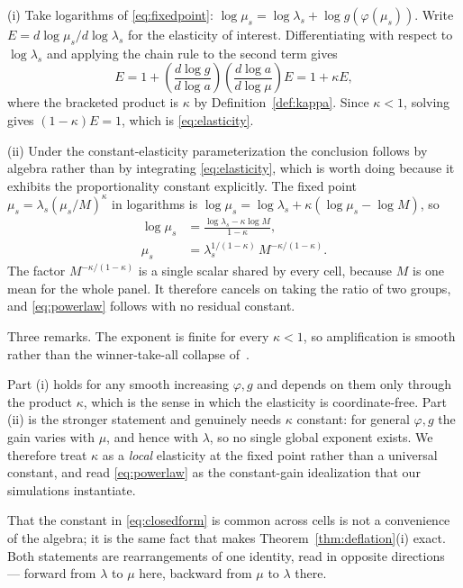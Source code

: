 \documentclass[journal,10pt,twocolumn]{IEEEtran}
\begin{document}
\begin{IEEEproof}
(i) Take logarithms of \eqref{eq:fixedpoint}:
$\log \mu_s = \log \lambda_s + \log g(\varphi(\mu_s))$. Write
$E = d \log \mu_s / d \log \lambda_s$ for the elasticity of interest.
Differentiating with respect to $\log \lambda_s$ and applying the chain rule to
the second term gives
\begin{equation}
E = 1 + \left(\frac{d \log g}{d \log a}\right)
        \left(\frac{d \log a}{d \log \mu}\right) E
  = 1 + \kappa E,
\end{equation}
where the bracketed product is $\kappa$ by Definition~\ref{def:kappa}. Since
$\kappa < 1$, solving gives $(1-\kappa)E = 1$, which is \eqref{eq:elasticity}.

(ii) Under the constant-elasticity parameterization the conclusion follows by
algebra rather than by integrating \eqref{eq:elasticity}, which is worth doing
because it exhibits the proportionality constant explicitly. The fixed point
$\mu_s = \lambda_s(\mu_s/M)^{\kappa}$ in logarithms is
$\log\mu_s = \log\lambda_s + \kappa(\log\mu_s - \log M)$, so
\begin{align}
\label{eq:closedform}
\log \mu_s &= \frac{\log \lambda_s - \kappa \log M}{1 - \kappa}, \nonumber\\
\mu_s &= \lambda_s^{1/(1-\kappa)}\, M^{-\kappa/(1-\kappa)}.
\end{align}
The factor $M^{-\kappa/(1-\kappa)}$ is a single scalar shared by every cell,
because $M$ is one mean for the whole panel. It therefore cancels on taking the
ratio of two groups, and \eqref{eq:powerlaw} follows with no residual constant.
\end{IEEEproof}

Three remarks. The exponent is finite for every $\kappa < 1$, so amplification is
smooth rather than the winner-take-all collapse of~\cite{ensign2018runaway}.

Part (i) holds for any smooth increasing $\varphi, g$ and depends on them only
through the product $\kappa$, which is the sense in which the elasticity is
coordinate-free. Part (ii) is the stronger statement and genuinely needs
$\kappa$ constant: for general $\varphi, g$ the gain varies with $\mu$, and hence
with $\lambda$, so no single global exponent exists. We therefore treat $\kappa$
as a \emph{local} elasticity at the fixed point rather than a universal
constant, and read \eqref{eq:powerlaw} as the constant-gain idealization that our
simulations instantiate.

That the constant in \eqref{eq:closedform} is common across cells is not a
convenience of the algebra; it is the same fact that makes
Theorem~\ref{thm:deflation}(i) exact. Both statements are rearrangements of one
identity, read in opposite directions --- forward from $\lambda$ to $\mu$ here,
backward from $\mu$ to $\lambda$ there.
\end{document}
